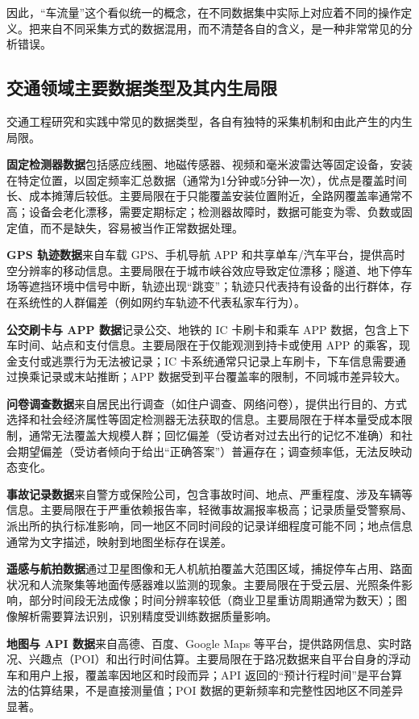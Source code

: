 因此，“车流量”这个看似统一的概念，在不同数据集中实际上对应着不同的操作定义。把来自不同采集方式的数据混用，而不清楚各自的含义，是一种非常常见的分析错误。

\subsection{交通领域主要数据类型及其内生局限}

交通工程研究和实践中常见的数据类型，各自有独特的采集机制和由此产生的内生局限。

\textbf{固定检测器数据}包括感应线圈、地磁传感器、视频和毫米波雷达等固定设备，安装在特定位置，以固定频率汇总数据（通常为1分钟或5分钟一次），优点是覆盖时间长、成本摊薄后较低。主要局限在于只能覆盖安装位置附近，全路网覆盖率通常不高；设备会老化漂移，需要定期标定；检测器故障时，数据可能变为零、负数或固定值，而不是缺失，容易被当作正常数据处理。

\textbf{GPS 轨迹数据}来自车载 GPS、手机导航 APP 和共享单车/汽车平台，提供高时空分辨率的移动信息。主要局限在于城市峡谷效应导致定位漂移；隧道、地下停车场等遮挡环境中信号中断，轨迹出现“跳变”；轨迹只代表持有设备的出行群体，存在系统性的人群偏差（例如网约车轨迹不代表私家车行为）。

\textbf{公交刷卡与 APP 数据}记录公交、地铁的 IC 卡刷卡和乘车 APP 数据，包含上下车时间、站点和支付信息。主要局限在于仅能观测到持卡或使用 APP 的乘客，现金支付或逃票行为无法被记录；IC 卡系统通常只记录上车刷卡，下车信息需要通过换乘记录或末站推断；APP 数据受到平台覆盖率的限制，不同城市差异较大。

\textbf{问卷调查数据}来自居民出行调查（如住户调查、网络问卷），提供出行目的、方式选择和社会经济属性等固定检测器无法获取的信息。主要局限在于样本量受成本限制，通常无法覆盖大规模人群；回忆偏差（受访者对过去出行的记忆不准确）和社会期望偏差（受访者倾向于给出“正确答案”）普遍存在；调查频率低，无法反映动态变化。

\textbf{事故记录数据}来自警方或保险公司，包含事故时间、地点、严重程度、涉及车辆等信息。主要局限在于严重依赖报告率，轻微事故漏报率极高；记录质量受警察局、派出所的执行标准影响，同一地区不同时间段的记录详细程度可能不同；地点信息通常为文字描述，映射到地图坐标存在误差。

\textbf{遥感与航拍数据}通过卫星图像和无人机航拍覆盖大范围区域，捕捉停车占用、路面状况和人流聚集等地面传感器难以监测的现象。主要局限在于受云层、光照条件影响，部分时间段无法成像；时间分辨率较低（商业卫星重访周期通常为数天）；图像解析需要算法识别，识别精度受训练数据质量影响。

\textbf{地图与 API 数据}来自高德、百度、Google Maps 等平台，提供路网信息、实时路况、兴趣点（POI）和出行时间估算。主要局限在于路况数据来自平台自身的浮动车和用户上报，覆盖率因地区和时段而异；API 返回的“预计行程时间”是平台算法的估算结果，不是直接测量值；POI 数据的更新频率和完整性因地区不同差异显著。

